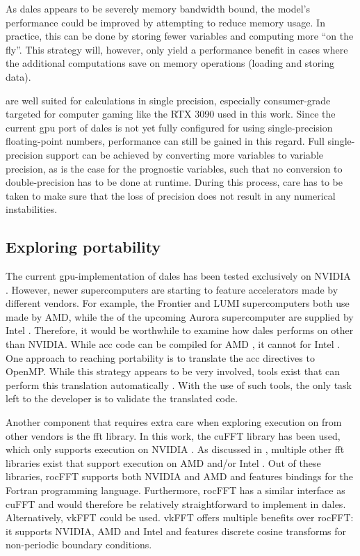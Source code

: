 As \acrshort{dales} appears to be severely memory bandwidth bound, the model's performance could be improved by attempting to reduce memory usage. In practice, this can be done by storing fewer variables and computing more ``on the fly''. This strategy will, however, only yield a performance benefit in cases where the additional computations save on memory operations (loading and storing data).

 are well suited for calculations in single precision, especially consumer-grade  targeted for computer gaming like the RTX 3090 used in this work. Since the current \acrshort{gpu} port of \acrshort{dales} is not yet fully configured for using single-precision floating-point numbers, performance can still be gained in this regard. Full single-precision support can be achieved by converting more variables to variable precision, as is the case for the prognostic variables, such that no conversion to double-precision has to be done at runtime. During this process, care has to be taken to make sure that the loss of precision does not result in any numerical instabilities.

\subsection{Exploring portability}
The current \acrshort{gpu}-implementation of \acrshort{dales} has been tested exclusively on NVIDIA . However, newer supercomputers are starting to feature accelerators made by different vendors. For example, the Frontier and LUMI supercomputers both use  made by AMD, while the  of the upcoming Aurora supercomputer are supplied by Intel \citep{traderHowArgonnePreparing2021}. Therefore, it would be worthwhile to examine how \acrshort{dales} performs on  other than NVIDIA. While \acrshort{acc} code can be compiled for AMD , it cannot for Intel . One approach to reaching portability is to translate the \acrshort{acc} directives to OpenMP. While this strategy appears to be very involved, tools exist that can perform this translation automatically \citep{servatIntelApplicationMigration2022}. With the use of such tools, the only task left to the developer is to validate the translated code.

Another component that requires extra care when exploring execution on  from other vendors is the \acrshort{fft} library. In this work, the cuFFT library has been used, which only supports execution on NVIDIA . As discussed in , multiple other \acrshort{fft} libraries exist that support execution on AMD and/or Intel . Out of these libraries, rocFFT supports both NVIDIA and AMD  and features bindings for the Fortran programming language. Furthermore, rocFFT has a similar interface as cuFFT and would therefore be relatively straightforward to implement in \acrshort{dales}. Alternatively, vkFFT could be used. vkFFT offers multiple benefits over rocFFT: it supports NVIDIA, AMD and Intel  and features discrete cosine transforms for non-periodic boundary conditions. 

